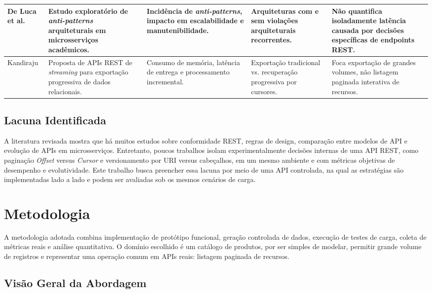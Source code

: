 \documentclass[journal]{IEEEtran}
\begin{document}
\begin{table}[htbp]
\begin{tabularx}{\textwidth}{|p{3.0cm}|X|X|X|X|}
\hline
De Luca et al. \cite{deluca2026} & Estudo exploratório de \textit{anti-patterns} arquiteturais em microsserviços acadêmicos. & Incidência de \textit{anti-patterns}, impacto em escalabilidade e manutenibilidade. & Arquiteturas com e sem violações arquiteturais recorrentes. & Não quantifica isoladamente latência causada por decisões específicas de endpoints REST. \\
\hline
Kandiraju \cite{kandiraju2026} & Proposta de APIs REST de \textit{streaming} para exportação progressiva de dados relacionais. & Consumo de memória, latência de entrega e processamento incremental. & Exportação tradicional vs. recuperação progressiva por cursores. & Foca exportação de grandes volumes, não listagem paginada interativa de recursos. \\
\hline
\end{tabularx}
\end{table}

\subsection{Lacuna Identificada}

A literatura revisada mostra que há muitos estudos sobre conformidade REST, regras de design, comparação entre modelos de API e evolução de APIs em microsserviços. Entretanto, poucos trabalhos isolam experimentalmente decisões internas de uma API REST, como paginação \textit{Offset} versus \textit{Cursor} e versionamento por URI versus cabeçalhos, em um mesmo ambiente e com métricas objetivas de desempenho e evolutividade. Este trabalho busca preencher essa lacuna por meio de uma API controlada, na qual as estratégias são implementadas lado a lado e podem ser avaliadas sob os mesmos cenários de carga.


\section{Metodologia}

A metodologia adotada combina implementação de protótipo funcional, geração controlada de dados, execução de testes de carga, coleta de métricas reais e análise quantitativa. O domínio escolhido é um catálogo de produtos, por ser simples de modelar, permitir grande volume de registros e representar uma operação comum em APIs reais: listagem paginada de recursos.

\subsection{Visão Geral da Abordagem}
\end{document}
